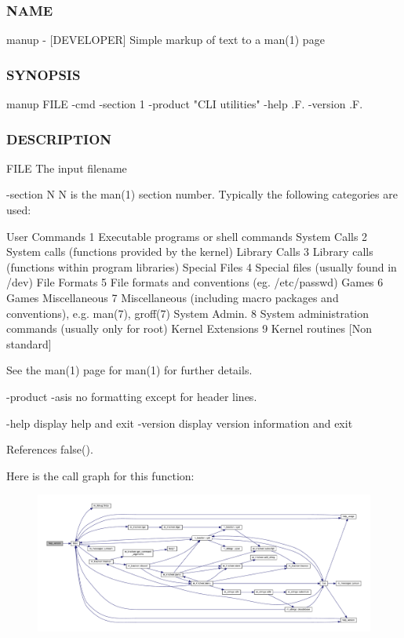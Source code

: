\subsubsection*{N\+A\+ME}

manup -\/ \mbox{[}D\+E\+V\+E\+L\+O\+P\+ER\mbox{]} Simple markup of text to a man(1) page 

\subsubsection*{S\+Y\+N\+O\+P\+S\+IS}

\begin{DoxyVerb}manup FILE -cmd -section 1 -product "CLI utilities" -help .F. -version .F.
\end{DoxyVerb}


\subsubsection*{D\+E\+S\+C\+R\+I\+P\+T\+I\+ON}

F\+I\+LE The input filename

-\/section N N is the man(1) section number. Typically the following categories are used\+:

User Commands 1 Executable programs or shell commands System Calls 2 System calls (functions provided by the kernel) Library Calls 3 Library calls (functions within program libraries) Special Files 4 Special files (usually found in /dev) File Formats 5 File formats and conventions (eg. /etc/passwd) Games 6 Games Miscellaneous 7 Miscellaneous (including macro packages and conventions), e.\+g. man(7), groff(7) System Admin. 8 System administration commands (usually only for root) Kernel Extensions 9 Kernel routines \mbox{[}Non standard\mbox{]}

See the man(1) page for man(1) for further details.

-\/product -\/asis no formatting except for header lines.

-\/help display help and exit -\/version display version information and exit 

References false().

Here is the call graph for this function\+:
\nopagebreak
\begin{figure}[H]
\begin{center}
\leavevmode
\includegraphics[width=350pt]{manup_8f90_a39c21619b08a3c22f19e2306efd7f766_cgraph}
\end{center}
\end{figure}
\mbox{\label{manup_8f90_a12de453acb5b104d198da168695af410}} 
